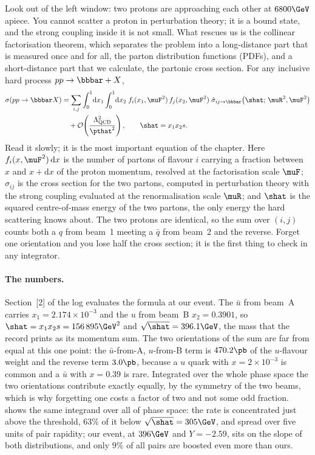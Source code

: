 Look out of the left window: two protons are approaching each other at
$6800\GeV$ apiece. You cannot scatter a proton in perturbation theory; it is
a bound state, and the strong coupling inside it is not small. What rescues
us is the collinear factorisation theorem, which separates the problem into a
long-distance part that is measured once and for all, the parton
distribution functions (PDFs), and a short-distance part that we calculate,
the partonic cross section. For any inclusive hard process
$pp\to\bbbar+X$,
\begin{equation}
\begin{split}
  \sigma(pp\to\bbbar X) &= \sum_{i,j}\int_0^1\!\mathrm{d}x_1\int_0^1\!\mathrm{d}x_2\;
  f_i(x_1,\muF^2)\, f_j(x_2,\muF^2)\;
  \hat\sigma_{ij\to\bbbar}\!\left(\shat;\, \muR^2,\muF^2\right) \\
  &\quad + \mathcal{O}\!\left(\frac{\Lambda^2_{\mathrm{QCD}}}{\pthat^2}\right),
  \qquad \shat = x_1x_2 s .
\end{split}
  \label{eq:ancestral_home:factorisation}
\end{equation}
Read it slowly; it is the most important equation of the chapter. Here
$f_i(x,\muF^2)\,\mathrm{d}x$ is the number of partons of flavour $i$ carrying
a fraction between $x$ and $x+\mathrm{d}x$ of the proton momentum, resolved at
the factorisation scale $\muF$; $\hat\sigma_{ij}$ is the cross section for
the two partons, computed in perturbation theory with the strong coupling
evaluated at the renormalisation scale $\muR$; and $\shat$ is the squared
centre-of-mass energy of the two partons, the only energy the hard scattering
knows about. The two protons are identical, so the sum over $(i,j)$ counts
both a $q$ from beam~1 meeting a $\bar q$ from beam~2 and the reverse. Forget
one orientation and you lose half the cross section; it is the first thing to
check in any integrator.

\paragraph{The numbers.} Section~[2] of the log evaluates the formula at
our event. The $\bar u$ from beam~A carries $x_1=2.174\times10^{-3}$ and the
$u$ from beam~B $x_2=0.3901$, so $\shat=x_1x_2s=156\,895\GeV^2$ and
$\sqrt{\shat}=396.1\GeV$, the mass that the record prints as its momentum
sum. The two orientations of the sum are far from equal at this one point:
the $\bar u$-from-A, $u$-from-B term is $470.2\pb$ of the $u$-flavour weight
and the reverse term $3.0\pb$, because a $u$ quark with $x=2\times10^{-3}$
is common and a $\bar u$ with $x=0.39$ is rare. Integrated over the whole
phase space the two orientations contribute exactly equally, by the symmetry
of the two beams, which is why forgetting one costs a factor of two and not
some odd fraction.  shows the
same integrand over all of phase space: the rate is concentrated just above
the threshold, $63\%$ of it below $\sqrt{\shat}=305\GeV$, and spread over
five units of pair rapidity; our event, at $396\GeV$ and $Y=-2.59$, sits on
the slope of both distributions, and only $9\%$ of all pairs are boosted
even more than ours.

